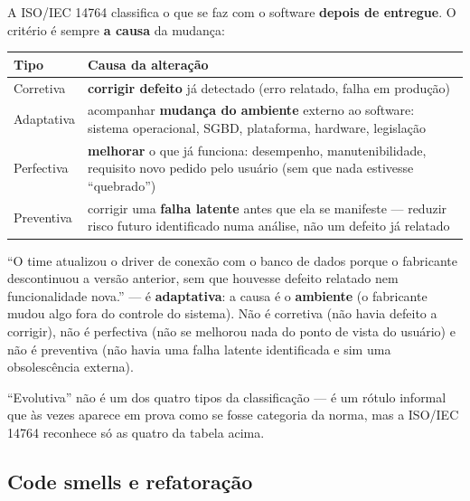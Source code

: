 \begin{conceito}
A ISO/IEC 14764 classifica o que se faz com o software \textbf{depois de
entregue}. O critério é sempre \textbf{a causa} da mudança:

\begin{center}
\begin{tabular}{@{}p{2.6cm}p{9.4cm}@{}}
\toprule
\textbf{Tipo} & \textbf{Causa da alteração} \\
\midrule
Corretiva & \textbf{corrigir defeito} já detectado (erro relatado, falha em
produção) \\
Adaptativa & acompanhar \textbf{mudança do ambiente} externo ao software:
sistema operacional, SGBD, plataforma, hardware, legislação \\
Perfectiva & \textbf{melhorar} o que já funciona: desempenho,
manutenibilidade, requisito novo pedido pelo usuário (sem que nada
estivesse “quebrado”) \\
Preventiva & corrigir uma \textbf{falha latente} antes que ela se
manifeste --- reduzir risco futuro identificado numa análise, não um
defeito já relatado \\
\bottomrule
\end{tabular}
\end{center}
\end{conceito}

\begin{exemplo}
“O time atualizou o driver de conexão com o banco de dados porque o
fabricante descontinuou a versão anterior, sem que houvesse defeito
relatado nem funcionalidade nova.” --- é \textbf{adaptativa}: a causa é o
\textbf{ambiente} (o fabricante mudou algo fora do controle do sistema).
Não é corretiva (não havia defeito a corrigir), não é perfectiva (não se
melhorou nada do ponto de vista do usuário) e não é preventiva (não havia
uma falha latente identificada e sim uma obsolescência externa).
\end{exemplo}

\begin{cuidado}
“Evolutiva” não é um dos quatro tipos da classificação --- é um rótulo
informal que às vezes aparece em prova como se fosse categoria da norma,
mas a ISO/IEC 14764 reconhece só as quatro da tabela acima.
\end{cuidado}

\subsection{Code smells e refatoração}

